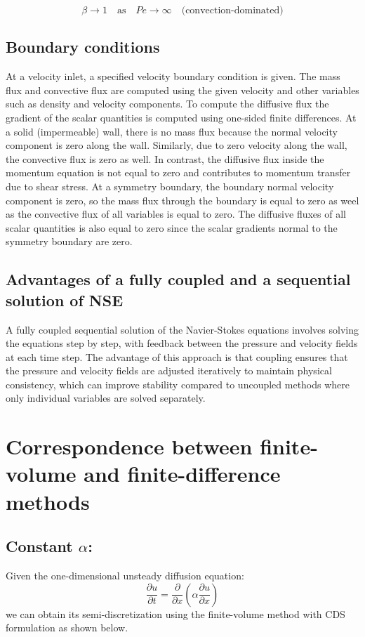 \documentclass{article}
\begin{document}
\[
\beta \to 1 \quad \text{as} \quad Pe \to \infty \quad \text{(convection-dominated)}
\]

\subsection{Boundary conditions}

At a velocity inlet, a specified velocity boundary condition is given. The mass flux and convective flux are computed using the given velocity 
and other variables such as density and velocity components. To compute the diffusive flux the gradient of the scalar quantities is computed using
one-sided finite differences. At a solid (impermeable) wall, there is no mass flux because the normal velocity component is zero along the wall. 
Similarly, due to zero velocity along the wall, the convective flux is zero as well. In contrast, the diffusive flux inside the momentum equation 
is not equal to zero and contributes to momentum transfer due to shear stress. At a symmetry boundary, the boundary normal velocity component is zero,
so the mass flux through the boundary is equal to zero as weel as the convective flux of all variables is equal to zero. The diffusive fluxes
of all scalar quantities is also equal to zero since the scalar gradients normal to the symmetry boundary are zero.

\subsection{Advantages of a fully coupled and a sequential solution of NSE}

A fully coupled sequential solution of the Navier-Stokes equations involves solving the equations step by step, with feedback between the 
pressure and velocity fields at each time step. The advantage of this approach is that coupling ensures that the pressure and velocity fields
are adjusted iteratively to maintain physical consistency, which can improve stability compared to uncoupled methods where only individual 
variables are solved separately.
\section{Correspondence between finite-volume and finite-difference methods}

\subsection{Constant $\alpha$:}
Given the one-dimensional unsteady diffusion equation:
\begin{equation}
  \frac{\partial u}{\partial t} = \frac{\partial}{\partial x} \left( \alpha \frac{\partial u}{\partial x} \right)
\end{equation}
we can obtain its semi-discretization using the finite-volume method with CDS formulation as shown below.
\end{document}
